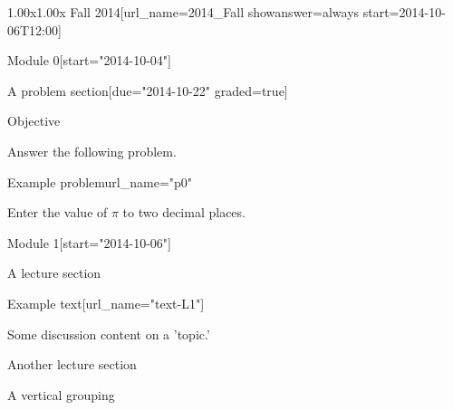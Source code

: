 \documentclass[12pt]{article}
\begin{document}
\begin{edXcourse}{1.00x}{1.00x Fall 2014}[url_name=2014_Fall showanswer=always start=2014-10-06T12:00]

\begin{edXchapter*}{Module 0}[start="2014-10-04"]

\begin{edXsequential}{A problem section}[due="2014-10-22" graded=true]

\begin{edXtext}{Objective}

Answer the following problem.

\end{edXtext}

\begin{edXproblem}{Example problem}{url_name="p0"}

Enter the value of $\pi$ to two decimal places.


\end{edXproblem}

\end{edXsequential}

\end{edXchapter*}

\begin{edXchapter}{Module 1}[start="2014-10-06"]

\begin{edXsequential}{A lecture section}

\begin{edXtext}{Example text}[url_name="text-L1"]

Some discussion content on a 'topic.'

\end{edXtext}

\end{edXsequential}

\begin{edXsequential}{Another lecture section}

\begin{edXvertical}{A vertical grouping}


\end{edXvertical}
\end{edXsequential}
\end{edXchapter}
\end{edXcourse}
\end{document}
